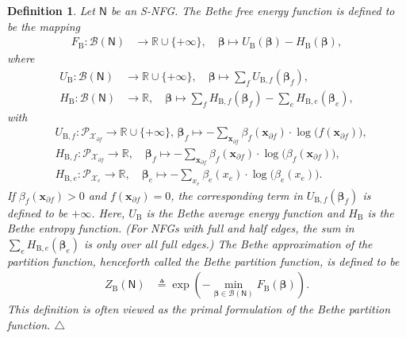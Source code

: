 \documentclass[journal]{IEEEtran}
\newtheorem{definition}[theorem]{Definition}
\newcommand{\manualendsymbol}[1]{%
  \leavevmode\unskip\penalty9999\hbox{}\nobreak\hfill
  \quad\hbox{#1}}
\newcommand{\edefinition}{\manualendsymbol{\ensuremath{\triangle}}}
\newcommand{\vect}[1]{ \bm{#1} }
\newcommand{\set}[1]{\mathcal{#1}}
\newcommand{\beli}{\beta}
\newcommand{\vbeli}{ \vect{\beli} }
\newcommand{\setpf}{ \partial f }
\newcommand{\sR}{\mathbb{R}}
\newcommand{\FB}{F_{ \mathrm{B} }}
\newcommand{\ZB}{Z_{ \mathrm{B} }}
\newcommand{\xe}{ x_{e} }
\newcommand{\setxe}{ \mathcal{X}_{e} }
\newcommand{\setxf}{ \mathcal{X}_{\setpf} }
\newcommand{\graphN}{ \mathsf{N} }
\newcommand{\defeq}{ \triangleq }
\newcommand{\LMP}{ \set{B} }
\newcommand{\xf}{ \bm{x}_{\setpf} }
\newcommand{\pmf}[1]{ \set{P}_{#1} }
\begin{document}
\begin{definition}\!\!\cite[Section V]{Yedidia2005}
  \label{sec:SNFG:def:1}
  Let $\graphN$ be an S-NFG. The Bethe free energy function
  is defined to be the mapping
  \begin{align*}
    \FB: \LMP(\graphN) & \to \sR \cup \{+\infty\}, \quad
    \vbeli \mapsto  U_{\mathrm{B}}(\vbeli) -  H_{\mathrm{B}}(\vbeli),
  \end{align*}
  where
  \begin{align*}
    U_{\mathrm{B}}: \LMP(\graphN) & \to \sR \cup \{+\infty\},\quad
    \vbeli \mapsto
    \sum_{f} U_{\mathrm{B},f}(\vbeli_{f}),
    \nonumber                                                      \\
    H_{\mathrm{B}}: \LMP(\graphN) & \to \sR,\quad
    \vbeli \mapsto \sum_{f}
    H_{\mathrm{B},f}(\vbeli_{f})
    - \sum_{e} H_{\mathrm{B},e}(\vbeli_{e}),
  \end{align*}
  with
  \begin{align*}
     & U_{\mathrm{B},f}: \pmf{\setxf}
    \to \sR \cup \{+\infty\},              \,
    \vbeli_{f}
    \mapsto
    -\!\!\sum_{\xf}
    \beli_f(\xf)
    \cdot
    \log\bigl( f(\xf) \bigr), \nonumber             \\
     & H_{\mathrm{B},f}: \pmf{\setxf} \to \sR,\quad
    \vbeli_{f} \mapsto
    -\sum_{\xf}
    \beli_f(\xf)
    \cdot
    \log\bigl( \beli_f(\xf) \bigr), \nonumber       \\
     & H_{\mathrm{B},e}: \pmf{\setxe} \to \sR,\quad
    \vbeli_{e} \mapsto -\sum_{\xe}
    \beli_{e}(\xe)
    \cdot
    \log\bigl( \beli_{e}(\xe) \bigr).
  \end{align*}
  If $\beli_f(\xf)>0$ and $f(\xf)=0$, the corresponding term in
  $U_{\mathrm{B},f}(\vbeli_f)$ is defined to be $+\infty$.
  Here, $ U_{\mathrm{B}} $ is the Bethe average energy function and $ H_{\mathrm{B}} $ is the Bethe entropy function.
  (For NFGs with full and half edges, the sum in $ \sum_{e} H_{\mathrm{B},e}(\vbeli_{e}) $ is only over all full
  edges.)  The Bethe approximation of the partition function, henceforth
  called the Bethe partition function, is defined to be
  \begin{align}
    \ZB(\graphN)
     & \defeq
    \exp
    \left(
    -
    \min_{\vbeli \in \LMP(\graphN)}
    \FB(\vbeli)
    \right).
    \label{sec:SNFG:eqn:4}
  \end{align}
  This definition is often viewed as the primal formulation of the Bethe partition function.
  \edefinition
\end{definition}
\end{document}
